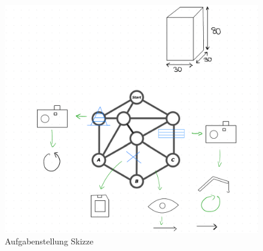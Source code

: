 \documentclass{article}
\begin{document}
\begin{figure}[H]
    \centering
    \includegraphics[width=0.6\linewidth]{Images/Pren_Skizze_Anforderungen.png}
    \caption{Aufgabenstellung Skizze}
    \label{fig:enter-label}
\end{figure}
\end{document}
